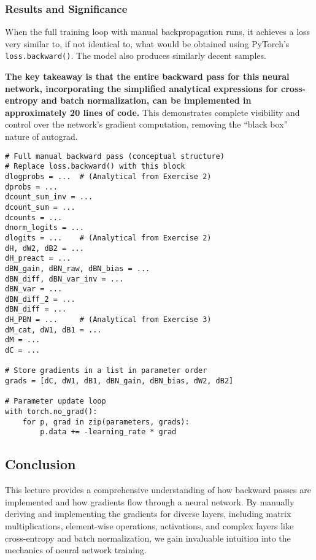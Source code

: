 \subsubsection{Results and Significance}
When the full training loop with manual backpropagation runs, it achieves a loss very similar to, if not identical to, what would be obtained using PyTorch's \texttt{loss.backward()}. The model also produces similarly decent samples.

\textbf{The key takeaway is that the entire backward pass for this neural network, incorporating the simplified analytical expressions for cross-entropy and batch normalization, can be implemented in approximately 20 lines of code.} This demonstrates complete visibility and control over the network's gradient computation, removing the ``black box'' nature of autograd.

\begin{lstlisting}[caption={Manual Backward Pass (Simplified View of Exercise 4 Block)}]
# Full manual backward pass (conceptual structure)
# Replace loss.backward() with this block
dlogprobs = ...  # (Analytical from Exercise 2)
dprobs = ...
dcount_sum_inv = ...
dcount_sum = ...
dcounts = ...
dnorm_logits = ...
dlogits = ...    # (Analytical from Exercise 2)
dH, dW2, dB2 = ...
dH_preact = ...
dBN_gain, dBN_raw, dBN_bias = ...
dBN_diff, dBN_var_inv = ...
dBN_var = ...
dBN_diff_2 = ...
dBN_diff = ...
dH_PBN = ...     # (Analytical from Exercise 3)
dM_cat, dW1, dB1 = ...
dM = ...
dC = ...

# Store gradients in a list in parameter order
grads = [dC, dW1, dB1, dBN_gain, dBN_bias, dW2, dB2]

# Parameter update loop
with torch.no_grad():
    for p, grad in zip(parameters, grads):
        p.data += -learning_rate * grad
\end{lstlisting}

\subsection{Conclusion}

This lecture provides a comprehensive understanding of how backward passes are implemented and how gradients flow through a neural network. By manually deriving and implementing the gradients for diverse layers, including matrix multiplications, element-wise operations, activations, and complex layers like cross-entropy and batch normalization, we gain invaluable intuition into the mechanics of neural network training.

